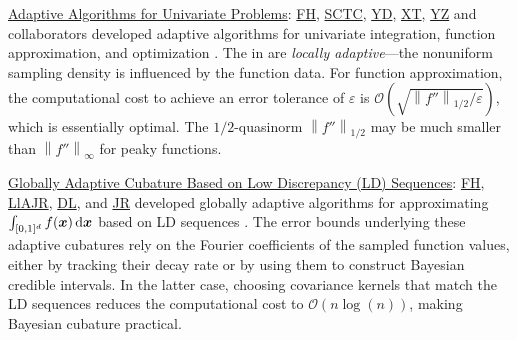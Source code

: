 \documentclass[11pt]{NSFamsart}
\newcommand{\Upara}[1]{\noindent\underline{\upshape #1}:}
\newcommand{\FH}{\hyperlink{FHlink}{FH}\xspace}
\newcommand{\SCTC}{\hyperlink{SCTClink}{SCTC}\xspace}
\newcommand{\YD}{\hyperlink{YDlink}{YD}\xspace}
\newcommand{\JR}{\hyperlink{JRlink}{JR}\xspace}
\newcommand{\LlAJR}{\hyperlink{LlAJRlink}{LlAJR}\xspace}
\newcommand{\XT}{\hyperlink{XTlink}{XT}\xspace}
\newcommand{\DL}{\hyperlink{DLlink}{DL}\xspace}
\newcommand{\YZ}{\hyperlink{YZlink}{YZ}\xspace}
\newcommand{\bx}{{\boldsymbol{x}}}
\def\dif{\textup{d}}
\def\abs#1{\ensuremath{\left \lvert #1 \right \rvert}}
\newcommand{\norm}[2][{}]{\ensuremath{\left \lVert #2 \right \rVert}_{#1}}
\newcommand{\Order}{\mathcal{O}}
\begin{document}

\Upara{Adaptive Algorithms for Univariate Problems}
\FH, \SCTC, \YD, \XT, \YZ and collaborators developed adaptive algorithms for univariate integration, function approximation, and optimization \cite{ChoEtal17a,HicEtal14b,  Din15a, Ton14a, Zha18a}.  The in \cite{ChoEtal17a} are \emph{locally adaptive}---the nonuniform sampling density is influenced by the function data.  For function approximation, the computational cost to achieve an error tolerance of $\varepsilon$ is $\Order\left(\sqrt{\norm[1/2]{f''}/\varepsilon} \right)$, which is essentially optimal.  The $1/2$-quasinorm $\norm[1/2]{f''}$ may be much smaller than
$\norm[\infty]{f''}$ for peaky functions.


\Upara{Globally Adaptive Cubature Based on Low Discrepancy (LD) Sequences}
\FH, \LlAJR, \DL, and \JR developed globally adaptive algorithms for approximating $\int_{[0,1]^d} f(\bx) \, \dif \bx$ based on LD sequences \cite{HicJim16a,HicEtal17a,JimHic16a,RatHic19a}.  The error bounds underlying these adaptive cubatures rely on the Fourier coefficients of the sampled function values, either by tracking their decay rate or by using them to construct Bayesian credible intervals.  In the latter case, choosing covariance kernels that match the LD sequences reduces the computational cost to $\Order(n \log(n))$, making Bayesian cubature practical.
\end{document}

